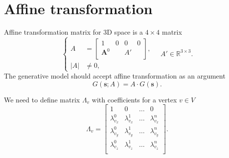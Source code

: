 \section{Affine transformation}

Affine transformation matrix for 3D space is a $4 \times 4$ matrix
\begin{equation}\label{eq:matrix:affine}
  \left\{\begin{aligned}
    A &= \begin{bmatrix}
      1         & 0 & 0  & 0 \\
      \pmb{A}^0 &   & A' &   \\
    \end{bmatrix}, \\
    \left| A \right| &\neq 0,
  \end{aligned}\right.
  \quad A' \in \mathbb{R}^{3 \times 3}.
\end{equation}
The generative model should accept affine transformation as an argument
\begin{equation*}
  G\left( \pmb{s}; A \right) = A \cdot G\left( \pmb{s} \right).
\end{equation*}

We need to define matrix $\Lambda_v$ with coefficients for
a vertex $v \in V$
\begin{equation*}
  \Lambda_v = \begin{bmatrix}
    1               & 0               & \dots & 0 \\
    \lambda^0_{v_x} & \lambda^1_{v_x} & \dots & \lambda^n_{v_x} \\
    \lambda^0_{v_y} & \lambda^1_{v_y} & \dots & \lambda^n_{v_y} \\
    \lambda^0_{v_z} & \lambda^1_{v_z} & \dots & \lambda^n_{v_z} \\
  \end{bmatrix}.
\end{equation*}

